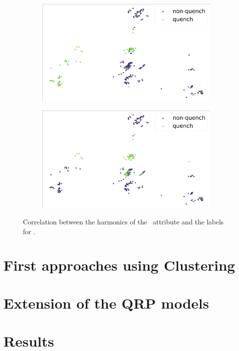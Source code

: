 \begin{figure}[!h]
\begin{subfigure}{0.49\linewidth}
	\end{subfigure}
	\begin{subfigure}{0.49\linewidth}
		\includegraphics[width=\linewidth]{img/quench_dist_qlp/quenches_coil_2_An.png}
	\end{subfigure}
	\begin{subfigure}{0.49\linewidth}
		\includegraphics[width=\linewidth]{img/quench_dist_qlp/quenches_coil_3_An.png}
	\end{subfigure}
	\caption{Correlation between the harmonics of the \an\ attribute and the labels for \qlp.}
	\label{fig:an-coilq-dist}
\end{figure}

\subsubsection{\bn}

\subsubsection{\cnmod}

\subsubsection{\phin}

\section{First approaches using Clustering}
\section{Extension of the QRP models}
\section{Results}
